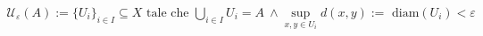 \documentclass[preview]{standalone}
\begin{document}
\begin{align*}
\mathcal{U}_{\varepsilon}(A) :=  \{U_i\}_{i \in I} \subseteq X \text{ tale che } \bigcup_{i \in I} U_i = A  \ \land \sup_{x,y \in U_i} d(x,y) := \text{ diam}(U_i) < \varepsilon
\end{align*}
\end{document}
